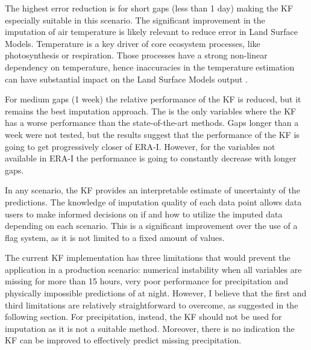 \documentclass{article}
\begin{document}
The highest error reduction is for short gaps (less than 1 day) making the KF especially suitable in this scenario. The significant improvement in the imputation of air temperature is likely relevant to reduce error in Land Surface Models. Temperature is a key driver of core ecosystem processes, like photosynthesis or respiration. Those processes have a strong non-linear dependency on temperature, hence inaccuracies in the temperature estimation can have substantial impact on the Land Surface Models output  \cite{bonan_climate_2019-2}.

For medium gaps (1 week) the relative performance of the KF is reduced, but it remains the best imputation approach. The  is the only variables where the KF has a worse performance than the state-of-the-art methods.
Gaps longer than a week were not tested, but the results suggest that the performance of the KF is going to get progressively closer of ERA-I. However, for the variables not available in ERA-I the performance is going to constantly decrease with longer gaps.

In any scenario, the KF provides an interpretable estimate of uncertainty of the predictions. The knowledge of imputation quality of each data point allows data users to make informed decisions on if and how to utilize the imputed data depending on each scenario. This is a significant improvement over the use of a flag system, as it is not limited to a fixed amount of values.

The current KF implementation has three limitations that would prevent the application in a production scenario: numerical instability when all variables are missing for more than 15 hours, very poor performance for precipitation and physically impossible predictions of  at night. However, I believe that the first and third limitations are relatively straightforward to overcome, as suggested in the following section. For precipitation, instead, the KF should not be used for imputation as it is not a suitable method. Moreover, there is no indication the KF can be improved to effectively predict missing precipitation.
\end{document}
